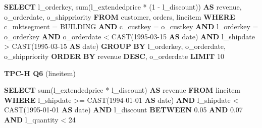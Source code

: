 \documentclass[
]{article}
\newenvironment{Shaded}{}{}
\newcommand{\DataTypeTok}[1]{\textcolor[rgb]{0.56,0.13,0.00}{#1}}
\newcommand{\DecValTok}[1]{\textcolor[rgb]{0.25,0.63,0.44}{#1}}
\newcommand{\FloatTok}[1]{\textcolor[rgb]{0.25,0.63,0.44}{#1}}
\newcommand{\FunctionTok}[1]{\textcolor[rgb]{0.02,0.16,0.49}{#1}}
\newcommand{\KeywordTok}[1]{\textcolor[rgb]{0.00,0.44,0.13}{\textbf{#1}}}
\newcommand{\NormalTok}[1]{#1}
\newcommand{\OperatorTok}[1]{\textcolor[rgb]{0.40,0.40,0.40}{#1}}
\newcommand{\StringTok}[1]{\textcolor[rgb]{0.25,0.44,0.63}{#1}}
\begin{document}
\begin{Shaded}
\begin{Highlighting}[]
\KeywordTok{SELECT}
\NormalTok{    l\_orderkey,}
    \FunctionTok{sum}\NormalTok{(l\_extendedprice }\OperatorTok{*}\NormalTok{ (}\DecValTok{1} \OperatorTok{{-}}\NormalTok{ l\_discount)) }\KeywordTok{AS}\NormalTok{ revenue,}
\NormalTok{    o\_orderdate,}
\NormalTok{    o\_shippriority}
\KeywordTok{FROM}
\NormalTok{    customer,}
\NormalTok{    orders,}
\NormalTok{    lineitem}
\KeywordTok{WHERE}
\NormalTok{    c\_mktsegment }\OperatorTok{=} \StringTok{\textquotesingle{}BUILDING\textquotesingle{}}
    \KeywordTok{AND}\NormalTok{ c\_custkey }\OperatorTok{=}\NormalTok{ o\_custkey}
    \KeywordTok{AND}\NormalTok{ l\_orderkey }\OperatorTok{=}\NormalTok{ o\_orderkey}
    \KeywordTok{AND}\NormalTok{ o\_orderdate }\OperatorTok{\textless{}} \FunctionTok{CAST}\NormalTok{(}\StringTok{\textquotesingle{}1995{-}03{-}15\textquotesingle{}} \KeywordTok{AS} \DataTypeTok{date}\NormalTok{)}
    \KeywordTok{AND}\NormalTok{ l\_shipdate }\OperatorTok{\textgreater{}} \FunctionTok{CAST}\NormalTok{(}\StringTok{\textquotesingle{}1995{-}03{-}15\textquotesingle{}} \KeywordTok{AS} \DataTypeTok{date}\NormalTok{)}
\KeywordTok{GROUP} \KeywordTok{BY}
\NormalTok{    l\_orderkey,}
\NormalTok{    o\_orderdate,}
\NormalTok{    o\_shippriority}
\KeywordTok{ORDER} \KeywordTok{BY}
\NormalTok{    revenue }\KeywordTok{DESC}\NormalTok{,}
\NormalTok{    o\_orderdate}
\KeywordTok{LIMIT} \DecValTok{10}
\end{Highlighting}
\end{Shaded}

\textbf{TPC-H Q6} (lineitem)

\begin{Shaded}
\begin{Highlighting}[]
\KeywordTok{SELECT}
    \FunctionTok{sum}\NormalTok{(l\_extendedprice }\OperatorTok{*}\NormalTok{ l\_discount) }\KeywordTok{AS}\NormalTok{ revenue}
\KeywordTok{FROM}
\NormalTok{    lineitem}
\KeywordTok{WHERE}
\NormalTok{    l\_shipdate }\OperatorTok{\textgreater{}=} \FunctionTok{CAST}\NormalTok{(}\StringTok{\textquotesingle{}1994{-}01{-}01\textquotesingle{}} \KeywordTok{AS} \DataTypeTok{date}\NormalTok{)}
    \KeywordTok{AND}\NormalTok{ l\_shipdate }\OperatorTok{\textless{}} \FunctionTok{CAST}\NormalTok{(}\StringTok{\textquotesingle{}1995{-}01{-}01\textquotesingle{}} \KeywordTok{AS} \DataTypeTok{date}\NormalTok{)}
    \KeywordTok{AND}\NormalTok{ l\_discount }\KeywordTok{BETWEEN} \FloatTok{0.05}
    \KeywordTok{AND} \FloatTok{0.07}
    \KeywordTok{AND}\NormalTok{ l\_quantity }\OperatorTok{\textless{}} \DecValTok{24}
\end{Highlighting}
\end{Shaded}
\end{document}
